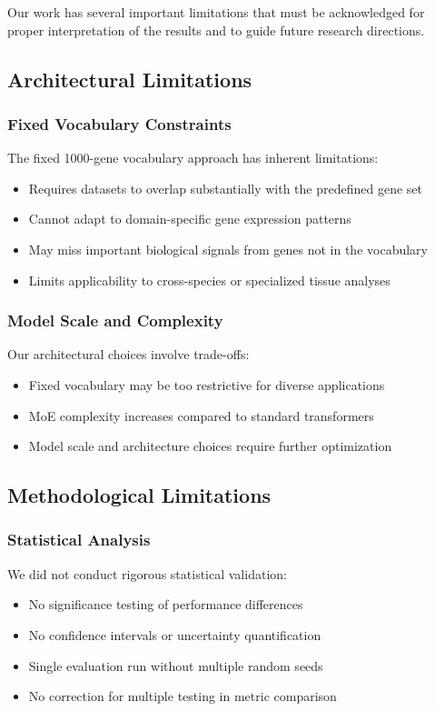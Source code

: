 Our work has several important limitations that must be acknowledged for proper interpretation of the results and to guide future research directions.


\subsection{Architectural Limitations}

\subsubsection{Fixed Vocabulary Constraints}
The fixed 1000-gene vocabulary approach has inherent limitations:
\begin{itemize}
\item Requires datasets to overlap substantially with the predefined gene set
\item Cannot adapt to domain-specific gene expression patterns
\item May miss important biological signals from genes not in the vocabulary
\item Limits applicability to cross-species or specialized tissue analyses
\end{itemize}

\subsubsection{Model Scale and Complexity}
Our architectural choices involve trade-offs:
\begin{itemize}
\item Fixed vocabulary may be too restrictive for diverse applications
\item MoE complexity increases compared to standard transformers
\item Model scale and architecture choices require further optimization
\end{itemize}

\subsection{Methodological Limitations}

\subsubsection{Statistical Analysis}
We did not conduct rigorous statistical validation:
\begin{itemize}
\item No significance testing of performance differences
\item No confidence intervals or uncertainty quantification
\item Single evaluation run without multiple random seeds
\item No correction for multiple testing in metric comparison
\end{itemize}

